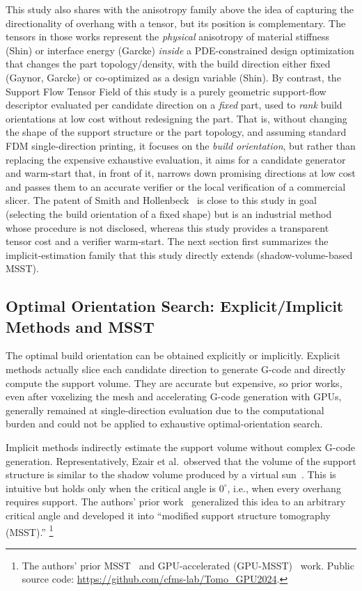 \documentclass[11pt,a4paper]{article}
\begin{document}
This study also shares with the anisotropy family above the idea of capturing the directionality of overhang with a tensor, but its position is complementary.
The tensors in those works represent the \emph{physical} anisotropy of material stiffness (Shin) or interface energy (Garcke)
\emph{inside} a PDE-constrained design optimization that changes the part topology/density,
with the build direction either fixed (Gaynor, Garcke) or co-optimized as a design variable (Shin).
By contrast, the Support Flow Tensor Field of this study is a purely geometric support-flow descriptor evaluated per candidate direction on a \emph{fixed} part,
used to \emph{rank} build orientations at low cost without redesigning the part.
That is, without changing the shape of the support structure or the part topology, and assuming standard FDM single-direction printing,
it focuses on the \emph{build orientation}, but rather than replacing the expensive exhaustive evaluation, it aims for a candidate generator and warm-start
that, in front of it, narrows down promising directions at low cost and passes them to an accurate verifier or the local verification of a commercial slicer.
The patent of Smith and Hollenbeck~\cite{smith2025patent} is close to this study in goal (selecting the build orientation of a fixed shape)
but is an industrial method whose procedure is not disclosed, whereas this study provides a transparent tensor cost and a verifier warm-start.
The next section first summarizes the implicit-estimation family that this study directly extends (shadow-volume-based MSST).

\subsection{Optimal Orientation Search: Explicit/Implicit Methods and MSST}

The optimal build orientation can be obtained explicitly or implicitly.
Explicit methods actually slice each candidate direction to generate G-code and directly compute the support volume.
They are accurate but expensive, so prior works, even after voxelizing the mesh and accelerating G-code generation with GPUs,
generally remained at single-direction evaluation due to the computational burden and could not be applied to exhaustive optimal-orientation search.

Implicit methods indirectly estimate the support volume without complex G-code generation.
Representatively, Ezair et al.\ observed that the volume of the support structure is similar to the shadow volume produced by a virtual sun~\cite{ezair}.
This is intuitive but holds only when the critical angle is $0^\circ$, i.e., when every overhang requires support.
The authors' prior work~\cite{msst} generalized this idea to an arbitrary critical angle
and developed it into ``modified support structure tomography (MSST).''%
\footnote{The authors' prior MSST~\cite{msst} and GPU-accelerated (GPU-MSST)~\cite{gpumsst} work. Public source code:
\url{https://github.com/cfms-lab/Tomo_GPU2024}.}
\end{document}

